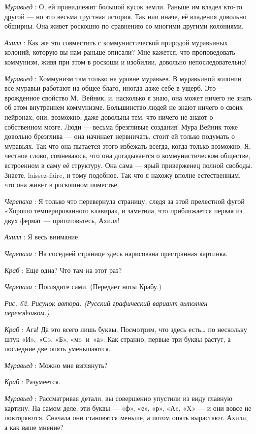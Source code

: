 \documentclass[../main.tex]{subfiles}
\begin{document}
\begin{dialogue}
\emph{Муравьед} : О, ей принадлежит большой кусок земли. Раньше им владел кто-то другой --- но это весьма грустная история. Так или иначе, её владения довольно обширны. Она живет роскошно по сравнению со многими другими колониями.

\emph{Ахилл} : Как же это совместить с коммунистической природой муравьиных колоний, которую вы нам раньше описали? Мне кажется, что проповедовать коммунизм, живя при этом в роскоши и изобилии, довольно непоследовательно!

\emph{Муравьед} : Коммунизм там только на уровне муравьев. В муравьиной колонии все муравьи работают на общее благо, иногда даже себе в ущерб. Это --- врожденное свойство М.~Вейник, и, насколько я знаю, она может ничего не знать об этом внутреннем коммунизме. Большинство людей не знают ничего о своих нейронах; они, возможно, даже довольны тем, что ничего не знают о собственном мозге. Люди --- весьма брезгливые создания! Мура Вейник тоже довольно брезглива --- она начинает нервничать, стоит ей только подумать о муравьях. Так что она пытается этого избежать всегда, когда только возможно. Я, честное слово, сомневаюсь, что она догадывается о коммунистическом обществе, встроенном в саму её структуру. Она сама --- ярый приверженец полной свободы. Знаете, laissez-faire, и тому подобное. Так что я нахожу вполне естественным, что она живет в роскошном поместье.

\emph{Черепаха} : Я только что перевернула страницу, следя за этой прелестной фугой «Хорошо темперированного клавира», и заметила, что приближается первая из двух фермат --- приготовьтесь, Ахилл!

\emph{Ахилл} : Я весь внимание.

\emph{Черепаха} : На соседней странице здесь нарисована престранная картинка.

\emph{Краб} : Еще одна? Что там на этот раз?

\emph{Черепаха} : Поглядите сами. (Передает ноты Крабу.)

\emph{Рис. 62. Рисунок автора. (Русский графический вариант выполнен переводчиком.)}

\emph{Краб} : Ага! Да это всего лишь буквы. Посмотрим, что здесь есть\ldots{} по нескольку штук «И»,~«С», «Б», «м»~и~«а». Как странно, первые три буквы растут, а последние две опять уменьшаются.

\emph{Муравьед} : Можно мне взглянуть?

\emph{Краб} : Разумеется.

\emph{Муравьед} : Рассматривая детали, вы совершенно упустили из виду главную картину. На самом деле, эти буквы --- «ф», «е», «р», «А», «X» --- и они вовсе не повторяются. Сначала они становятся меньше, а потом опять вырастают. Ахилл, а как ваше мнение?


\end{dialogue}
\end{document}
